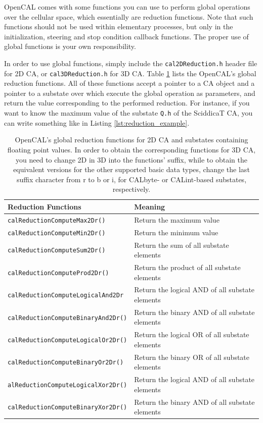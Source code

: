 OpenCAL comes with some functions you can use to perform global
operations over the cellular space, which essentially are reduction
functions. Note that such functions should not be used within
elementary processes, but only in the initialization, steering and
stop condition callback functions. The proper use of global functions
is your own responsibility.

In order to use global functions, simply include the
\verb'cal2DReduction.h' header file for 2D CA, or
\verb'cal3DReduction.h' for 3D CA. Table \ref{tab:reductions} lists
the OpenCAL's global reduction functions. All of these functions
accept a pointer to a CA object and a pointer to a substate over
which execute the global operation as parameters, and return the value
corresponding to the performed reduction. For instance, if you want to
know the maximum value of the substate \verb'Q.h' of the SciddicaT CA,
you can write something like in Listing \ref{lst:reduction_example}.



\begin{table}
  \centering
  \footnotesize
  \begin{tabular}{l|l}
    \hline
    Reduction Functions & Meaning \\
    \hline
    \verb'calReductionComputeMax2Dr()'       & Return the maximum value\\
    \verb'calReductionComputeMin2Dr()'       & Return the minimum value\\
    \verb'calReductionComputeSum2Dr()'       & Return the sum of all substate elements\\
    \verb'calReductionComputeProd2Dr()'      & Return the product of all substate elements\\
    \verb'calReductionComputeLogicalAnd2Dr'  & Return the logical AND of all substate elements\\
    \verb'calReductionComputeBinaryAnd2Dr()' & Return the binary AND of all substate elements\\
    \verb'calReductionComputeLogicalOr2Dr()' & Return the logical OR of all substate elements\\
    \verb'calReductionComputeBinaryOr2Dr()'  & Return the binary OR of all substate elements\\
    \verb'alReductionComputeLogicalXor2Dr()' & Return the logical AND of all substate elements\\
    \verb'calReductionComputeBinaryXor2Dr()' & Return the binary AND of all substate elements\\
    \hline
  \end{tabular}
  \caption{OpenCAL's global reduction functions for 2D CA and
    substates containing floating point values. In order to obtain the
    corresponding functions for 3D CA, you need to change 2D in 3D
    into the functions' suffix, while to obtain the equivalent
    versions for the other supported basic data types, change the last
    suffix character from r to b or i, for CALbyte- or CALint-based
    substates, respectively.}
  \label{tab:reductions}
\end{table}


